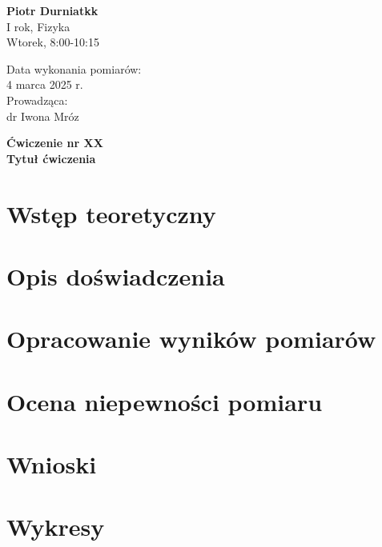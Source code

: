 \documentclass[a4paper,12pt]{article}
\begin{document}
\noindent
\begin{minipage}{0.5\textwidth}
    \raggedright
    \textbf{Piotr Durniatkk} \\
    I rok, Fizyka \\
    Wtorek, 8:00-10:15 \\
    \vspace{0.5cm}
    \vspace{0.5cm}
\end{minipage}%
\begin{minipage}{0.5\textwidth}
    \raggedleft
    Data wykonania pomiarów: \\
    4 marca 2025 r. \\
    \vspace{0.5cm} %
    Prowadząca: \\
    dr Iwona Mróz 
\end{minipage}

\vspace{2cm} %
\begin{center}
    \LARGE \textbf{Ćwiczenie nr XX} \\[0.5cm]
    \Large \textbf{Tytuł ćwiczenia}
\end{center}

\vspace{1cm} %
\noindent

\section{Wstęp teoretyczny}

\section{Opis doświadczenia}

\section{Opracowanie wyników pomiarów}


\section{Ocena niepewności pomiaru}

\section{Wnioski}

\section{Wykresy}



\end{document}

